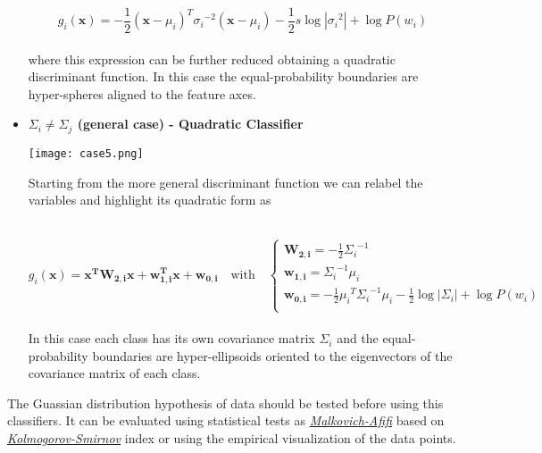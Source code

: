 \documentclass{standalone}
\begin{document}
\begin{itemize}
$$
g_i(\mathbf{x}) = -\frac{1}{2}(\mathbf{x}-\mu_i)^T{\sigma_i}^{-2}(\mathbf{x}-\mu_i) -\frac{1}{2}s\log\left|{\sigma_i}^2\right|+\log P(w_i)
$$
\\
where this expression can be further reduced obtaining a quadratic discriminant function.
In this case the equal-probability boundaries are hyper-spheres aligned to the feature axes.


\item \textbf{$\Sigma_i \neq\Sigma_j$ (general case) - Quadratic Classifier}

\begin{minipage}{.30\textwidth}
\hspace{-.5cm}
\texttt{[image: case5.png]}
\end{minipage}%
\begin{minipage}{.70\textwidth}
Starting from the more general discriminant function we can relabel the variables and highlight its quadratic form as
\end{minipage}\\

$$
g_i(\mathbf{x}) = \mathbf{x^TW_{2,i}x}+\mathbf{w_{1,i}^Tx} + \mathbf{w_{0,i}} \quad \mbox{with}\quad \left\{\begin{array}{l} \mathbf{W_{2,i}}=-\frac{1}{2}{\Sigma_i}^{-1}\\ \mathbf{w_{1,i}}={\Sigma_i}^{-1}\mu_i \\ \mathbf{w_{0,i}}=-\frac{1}{2}{\mu_i}^T{\Sigma_i}^{-1}\mu_i-\frac{1}{2}\log\left|\Sigma_i\right|+\log P(w_i) \\ \end{array}\right.
$$
\\
In this case each class has its own covariance matrix $\Sigma_i$ and the equal-probability boundaries are hyper-ellipsoids oriented to the eigenvectors of the covariance matrix of each class.

\end{itemize}

The Guassian distribution hypothesis of data should be tested before using this classifiers.
It can be evaluated using statistical tests as \href{https://www.jstor.org/stable/2284163?seq=1#page_scan_tab_contents}{\emph{Malkovich-Afifi}} based on \href{https://en.wikipedia.org/wiki/Kolmogorov–Smirnov_test}{\emph{Kolmogorov-Smirnov}} index or using the empirical visualization of the data points.
\end{document}
